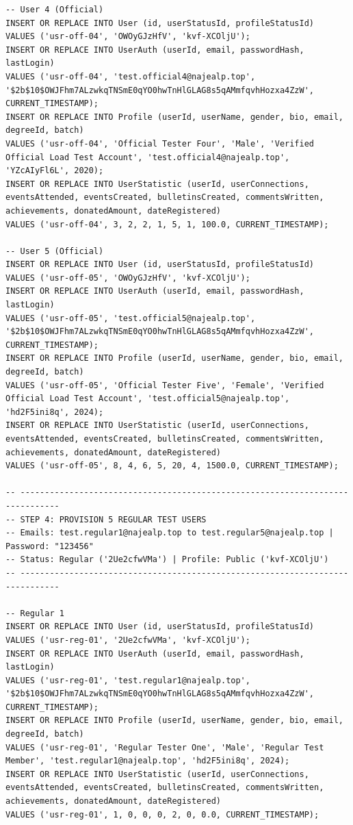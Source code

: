 \documentclass[11pt,letterpaper]{article}
\begin{document}
\begin{lstlisting}
-- User 4 (Official)
INSERT OR REPLACE INTO User (id, userStatusId, profileStatusId)
VALUES ('usr-off-04', 'OWOyGJzHfV', 'kvf-XCOljU');
INSERT OR REPLACE INTO UserAuth (userId, email, passwordHash, lastLogin)
VALUES ('usr-off-04', 'test.official4@najealp.top', '$2b$10$OWJFhm7ALzwkqTNSmE0qYO0hwTnHlGLAG8s5qAMmfqvhHozxa4ZzW', CURRENT_TIMESTAMP);
INSERT OR REPLACE INTO Profile (userId, userName, gender, bio, email, degreeId, batch)
VALUES ('usr-off-04', 'Official Tester Four', 'Male', 'Verified Official Load Test Account', 'test.official4@najealp.top', 'YZcAIyFl6L', 2020);
INSERT OR REPLACE INTO UserStatistic (userId, userConnections, eventsAttended, eventsCreated, bulletinsCreated, commentsWritten, achievements, donatedAmount, dateRegistered)
VALUES ('usr-off-04', 3, 2, 2, 1, 5, 1, 100.0, CURRENT_TIMESTAMP);

-- User 5 (Official)
INSERT OR REPLACE INTO User (id, userStatusId, profileStatusId)
VALUES ('usr-off-05', 'OWOyGJzHfV', 'kvf-XCOljU');
INSERT OR REPLACE INTO UserAuth (userId, email, passwordHash, lastLogin)
VALUES ('usr-off-05', 'test.official5@najealp.top', '$2b$10$OWJFhm7ALzwkqTNSmE0qYO0hwTnHlGLAG8s5qAMmfqvhHozxa4ZzW', CURRENT_TIMESTAMP);
INSERT OR REPLACE INTO Profile (userId, userName, gender, bio, email, degreeId, batch)
VALUES ('usr-off-05', 'Official Tester Five', 'Female', 'Verified Official Load Test Account', 'test.official5@najealp.top', 'hd2F5ini8q', 2024);
INSERT OR REPLACE INTO UserStatistic (userId, userConnections, eventsAttended, eventsCreated, bulletinsCreated, commentsWritten, achievements, donatedAmount, dateRegistered)
VALUES ('usr-off-05', 8, 4, 6, 5, 20, 4, 1500.0, CURRENT_TIMESTAMP);

-- ------------------------------------------------------------------------------
-- STEP 4: PROVISION 5 REGULAR TEST USERS
-- Emails: test.regular1@najealp.top to test.regular5@najealp.top | Password: "123456"
-- Status: Regular ('2Ue2cfwVMa') | Profile: Public ('kvf-XCOljU')
-- ------------------------------------------------------------------------------

-- Regular 1
INSERT OR REPLACE INTO User (id, userStatusId, profileStatusId)
VALUES ('usr-reg-01', '2Ue2cfwVMa', 'kvf-XCOljU');
INSERT OR REPLACE INTO UserAuth (userId, email, passwordHash, lastLogin)
VALUES ('usr-reg-01', 'test.regular1@najealp.top', '$2b$10$OWJFhm7ALzwkqTNSmE0qYO0hwTnHlGLAG8s5qAMmfqvhHozxa4ZzW', CURRENT_TIMESTAMP);
INSERT OR REPLACE INTO Profile (userId, userName, gender, bio, email, degreeId, batch)
VALUES ('usr-reg-01', 'Regular Tester One', 'Male', 'Regular Test Member', 'test.regular1@najealp.top', 'hd2F5ini8q', 2024);
INSERT OR REPLACE INTO UserStatistic (userId, userConnections, eventsAttended, eventsCreated, bulletinsCreated, commentsWritten, achievements, donatedAmount, dateRegistered)
VALUES ('usr-reg-01', 1, 0, 0, 0, 2, 0, 0.0, CURRENT_TIMESTAMP);


\end{lstlisting}
\end{document}
